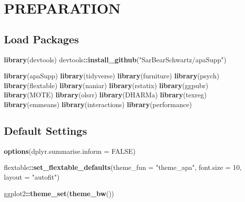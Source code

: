 \documentclass[
]{article}
\newenvironment{Shaded}{\begin{snugshade}}{\end{snugshade}}
\newcommand{\AttributeTok}[1]{\textcolor[rgb]{0.13,0.29,0.53}{#1}}
\newcommand{\ConstantTok}[1]{\textcolor[rgb]{0.56,0.35,0.01}{#1}}
\newcommand{\DecValTok}[1]{\textcolor[rgb]{0.00,0.00,0.81}{#1}}
\newcommand{\FunctionTok}[1]{\textcolor[rgb]{0.13,0.29,0.53}{\textbf{#1}}}
\newcommand{\NormalTok}[1]{#1}
\newcommand{\SpecialCharTok}[1]{\textcolor[rgb]{0.81,0.36,0.00}{\textbf{#1}}}
\newcommand{\StringTok}[1]{\textcolor[rgb]{0.31,0.60,0.02}{#1}}
\begin{document}
\clearpage

\hypertarget{preparation}{%
\section{PREPARATION}\label{preparation}}

\hypertarget{load-packages}{%
\subsection{Load Packages}\label{load-packages}}

\begin{Shaded}
\begin{Highlighting}[]
\FunctionTok{library}\NormalTok{(devtools)}
\NormalTok{devtools}\SpecialCharTok{::}\FunctionTok{install\_github}\NormalTok{(}\StringTok{"SarBearSchwartz/apaSupp"}\NormalTok{)}
\end{Highlighting}
\end{Shaded}

\begin{Shaded}
\begin{Highlighting}[]
\FunctionTok{library}\NormalTok{(apaSupp)}
\FunctionTok{library}\NormalTok{(tidyverse)}
\FunctionTok{library}\NormalTok{(furniture)}
\FunctionTok{library}\NormalTok{(psych)}
\FunctionTok{library}\NormalTok{(flextable)}
\FunctionTok{library}\NormalTok{(naniar)}
\FunctionTok{library}\NormalTok{(rstatix)}
\FunctionTok{library}\NormalTok{(ggpubr)}
\FunctionTok{library}\NormalTok{(MOTE)}
\FunctionTok{library}\NormalTok{(olsrr)}
\FunctionTok{library}\NormalTok{(DHARMa)}
\FunctionTok{library}\NormalTok{(texreg)}
\FunctionTok{library}\NormalTok{(emmeans)}
\FunctionTok{library}\NormalTok{(interactions)}
\FunctionTok{library}\NormalTok{(performance)}
\end{Highlighting}
\end{Shaded}

\hypertarget{default-settings}{%
\subsection{Default Settings}\label{default-settings}}

\begin{Shaded}
\begin{Highlighting}[]
\FunctionTok{options}\NormalTok{(}\AttributeTok{dplyr.summarise.inform =} \ConstantTok{FALSE}\NormalTok{)}

\NormalTok{flextable}\SpecialCharTok{::}\FunctionTok{set\_flextable\_defaults}\NormalTok{(}\AttributeTok{theme\_fun =} \StringTok{"theme\_apa"}\NormalTok{,}
                                  \AttributeTok{font.size =} \DecValTok{10}\NormalTok{,}
                                  \AttributeTok{layout =} \StringTok{"autofit"}\NormalTok{)}

\NormalTok{ggplot2}\SpecialCharTok{::}\FunctionTok{theme\_set}\NormalTok{(}\FunctionTok{theme\_bw}\NormalTok{())}
\end{Highlighting}
\end{Shaded}
\end{document}
